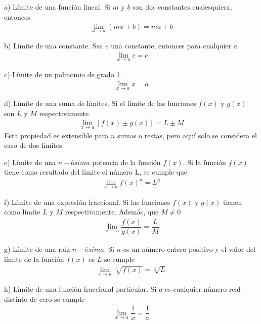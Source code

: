 \noindent a) Límite de una función lineal. Si $m$ y $b$ son dos constantes cualesquiera, entonces \\
\begin{eqnarray}
\lim_{x\rightarrow a}(mx+b)=ma+b
\end{eqnarray}

\noindent b) Límite de una constante. Sea $c$ una constante, entonces para cualquier $a$ \\
\begin{eqnarray}
\lim_{x\rightarrow a}c=c
\end{eqnarray}

\noindent c) Límite de un polinomio de grado 1. \\
\begin{eqnarray}
\lim_{x\rightarrow a}x=a
\end{eqnarray}

\noindent d) Límite de una suma de límites. Si el límite de las funciones $f(x)$ y $g(x)$ son $L$ y $M$ respectivamente \\
\begin{eqnarray}
\lim_{x\rightarrow a}[f(x)\pm g(x)]=L\pm M
\end{eqnarray}
Esta propiedad es extensible para $n$ sumas o restas, pero aquí solo se considera el caso de dos límites.

\noindent e) Límite de una $n-$é$sima$ potencia de la función $f(x)$. Si la función $f(x)$ tiene como resultado del límite el número L, se cumple que \\
\begin{eqnarray}
\lim_{x\rightarrow a}f(x)^{n}=L^{n}
\end{eqnarray}

\noindent f) Límite de una expresión fraccional. Si las funciones $f(x)$ y $g(x)$ tienen como límite $L$ y $M$ respectivamente. Además, que $M\neq 0$ \\
\begin{eqnarray}
\lim_{x\rightarrow a}\dfrac{f(x)}{g(x)}=\dfrac{L}{M}
\end{eqnarray}

\noindent g) Límite de una raíz $n-$é$sima$. Si $n$ es un número entero positivo y el valor del límite de la función $f(x)$ es $L$ se cumple \\
\begin{eqnarray}
\lim_{x\rightarrow a}\sqrt[n]{f(x)}=\sqrt[n]{L}
\end{eqnarray}

\noindent h) Límite de una función fraccional particular. Si $a$ es cualquier número real distinto de cero se cumple \\
\begin{eqnarray}
\lim_{x\rightarrow a}\dfrac{1}{x}=\dfrac{1}{a}
\end{eqnarray}

